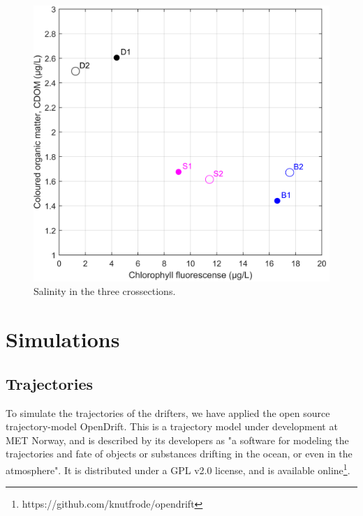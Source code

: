 \documentclass[12pt,a4paper,english]{article}
\begin{document}
\begin{figure}[ht]
\centerline{
\includegraphics*[width=\textwidth]{Figurer/CF_diagram.png}}
\caption{\small
Salinity in the three crossections.}
\label{fig:CFdiagram}
\end{figure}

\clearpage

\section{Simulations}

\subsection{Trajectories}
\label{sect:trajmod}
To simulate the trajectories of the drifters, we have applied the open source trajectory-model OpenDrift. This is a trajectory model under development at MET Norway, and is described by its developers as "a software for modeling the trajectories and fate of objects or substances drifting in the ocean, or even in the atmosphere". It is distributed under a GPL v2.0 license, and is available online\footnote{https://github.com/knutfrode/opendrift}.
\end{document}
